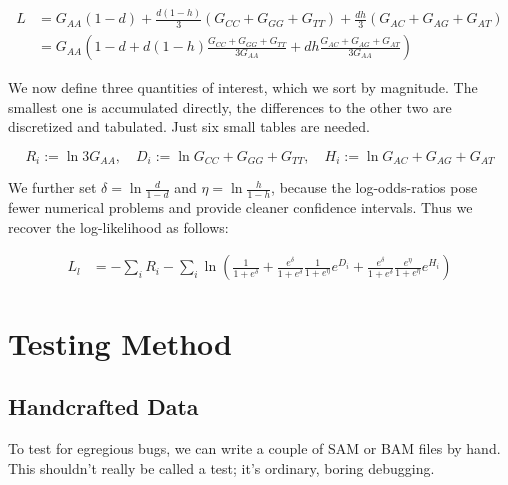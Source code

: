 \documentclass{article}
\begin{document}
\begin{align*}
L &= G_{AA} \left( 1-d \right) + \frac{d(1-h)}{3} \left( G_{CC} + G_{GG} + G_{TT} \right)
          + \frac{dh}{3} \left( G_{AC} + G_{AG} + G_{AT} \right) \\
  &= G_{AA} \left( 1-d + d(1-h) \frac{G_{CC} + G_{GG} + G_{TT}}{3 G_{AA}}
          + dh \frac{G_{AC} + G_{AG} + G_{AT}}{3 G_{AA}} \right)
\end{align*}

We now define three quantities of interest, which we sort by magnitude.
The smallest one is accumulated directly, the differences to the other
two are discretized and tabulated.  Just six small tables are needed.

\begin{equation*}
R_i := \ln 3 G_{AA}, \quad
D_i := \ln G_{CC} + G_{GG} + G_{TT}, \quad
H_i := \ln G_{AC} + G_{AG} + G_{AT} 
\end{equation*}

We further set $\delta = \ln \frac{d}{1-d}$ and $\eta = \ln
\frac{h}{1-h}$, because the log-odds-ratios pose fewer numerical
problems and provide cleaner confidence intervals.  Thus we recover the
log-likelihood as follows:

\begin{align*}
L_l &= - \sum_{i} R_i - \sum_{i} \ln \left( \frac{1}{1+e^\delta} +
    \frac{e^\delta}{1+e^\delta} \frac{1}{1+e^\eta} e^{D_i} +
    \frac{e^\delta}{1+e^\delta} \frac{e^\eta}{1+e^\eta} e^{H_i} \right)
\end{align*}



\section{Testing Method}

\subsection{Handcrafted Data}

To test for egregious bugs, we can write a couple of SAM or BAM files by
hand.  This shouldn't really be called a test; it's ordinary, boring
debugging.

\end{document}
